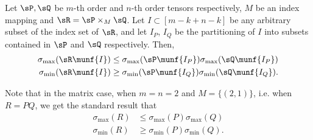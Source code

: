 \begin{theorem}
  \label{thm:tensor-multiplication}
Let $\sP, \sQ$ be $m$-th order and $n$-th order tensors respectively, $M$ be an
  index mapping and $\sR = \sP \times_M \sQ$. 
Let $I \subset [m - k + n - k]$ be any arbitrary subset of the index set
  of $\sR$,
and let $I_P$, $I_Q$ be the partitioning of $I$ into subsets contained
  in $\sP$ and $\sQ$ respectively.
Then,
\begin{align*}
\sigma_{\max}(\sR\munf{I}) &\le \sigma_{\max}(\sP\munf{I_P}) \sigma_{\max}(\sQ\munf{I_P}) \\
\sigma_{\min}(\sR\munf{I}) &\ge \sigma_{\min}(\sP\munf{I_Q}) \sigma_{\min}(\sQ\munf{I_Q}).
\end{align*}
\end{theorem}

Note that in the matrix case, when $m = n = 2$ and $M=\{(2,1)\}$, i.e.
when $R = P Q$, we get the standard result that 
\begin{align}
\sigma_{\max}(R) &\le \sigma_{\max}(P) \sigma_{\max}(Q) \\
\sigma_{\min}(R) &\ge \sigma_{\min}(P) \sigma_{\min}(Q) \label{eqn:matrix-singular}.
\end{align}

